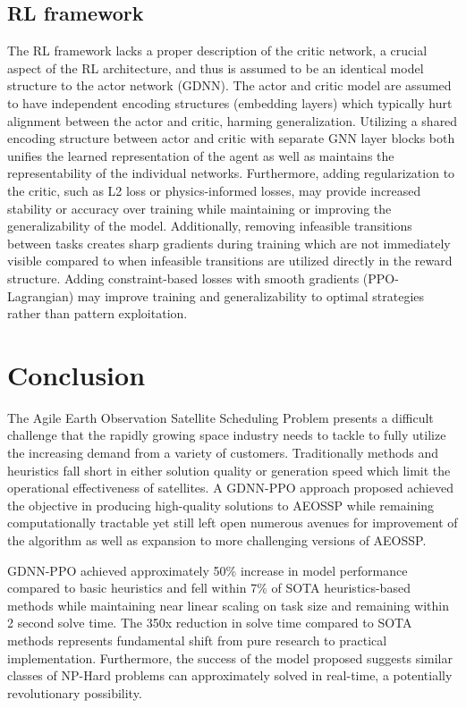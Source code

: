 \documentclass[conf]{new-aiaa}
\begin{document}
\subsection{RL framework}
The RL framework lacks a proper description of the critic network, a crucial aspect of the RL architecture, and thus is assumed to be an identical model structure to the actor network (GDNN).
The actor and critic model are assumed to have independent encoding structures (embedding layers) which typically hurt alignment between the actor and critic, harming generalization.
Utilizing a shared encoding structure between actor and critic with separate GNN layer blocks both unifies the learned representation of the agent as well as maintains the representability of the individual networks.
Furthermore, adding regularization to the critic, such as L2 loss or physics-informed losses, may provide increased stability or accuracy over training while maintaining or improving the generalizability of the model.
Additionally, removing infeasible transitions between tasks creates sharp gradients during training which are not immediately visible compared to when infeasible transitions are utilized directly in the reward structure.
Adding constraint-based losses with smooth gradients (PPO-Lagrangian) may improve training and generalizability to optimal strategies rather than pattern exploitation.

\section{Conclusion}
The Agile Earth Observation Satellite Scheduling Problem presents a difficult challenge that the rapidly growing space industry needs to tackle to fully utilize the increasing demand from a variety of customers.
Traditionally methods and heuristics fall short in either solution quality or generation speed which limit the operational effectiveness of satellites.
A GDNN-PPO approach proposed achieved the objective in producing high-quality solutions to AEOSSP while remaining computationally tractable yet still left open numerous avenues for improvement of the algorithm as well as expansion to more challenging versions of AEOSSP.

GDNN-PPO achieved approximately 50\% increase in model performance compared to basic heuristics and fell within 7\% of SOTA heuristics-based methods while maintaining near linear scaling on task size and remaining within 2 second solve time.
The 350x reduction in solve time compared to SOTA methods represents fundamental shift from pure research to practical implementation.
Furthermore, the success of the model proposed suggests similar classes of NP-Hard problems can approximately solved in real-time, a potentially revolutionary possibility.
\end{document}
